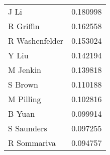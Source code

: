 \begin{table}[H] \centering\begin{tabular}{lr}
\toprule
           \hphantom{ } J Li &  0.180998 \\
      \hphantom{ } R Griffin &  0.162558 \\
 \hphantom{ } R Washenfelder &  0.153024 \\
          \hphantom{ } Y Liu &  0.142194 \\
       \hphantom{ } M Jenkin &  0.139818 \\
        \hphantom{ } S Brown &  0.110188 \\
      \hphantom{ } M Pilling &  0.102816 \\
         \hphantom{ } B Yuan &  0.099914 \\
     \hphantom{ } S Saunders &  0.097255 \\
    \hphantom{ } R Sommariva &  0.094757 \\
\bottomrule
\end{tabular}

    \label{tab:betweenness_Author}
    \end{table}

    